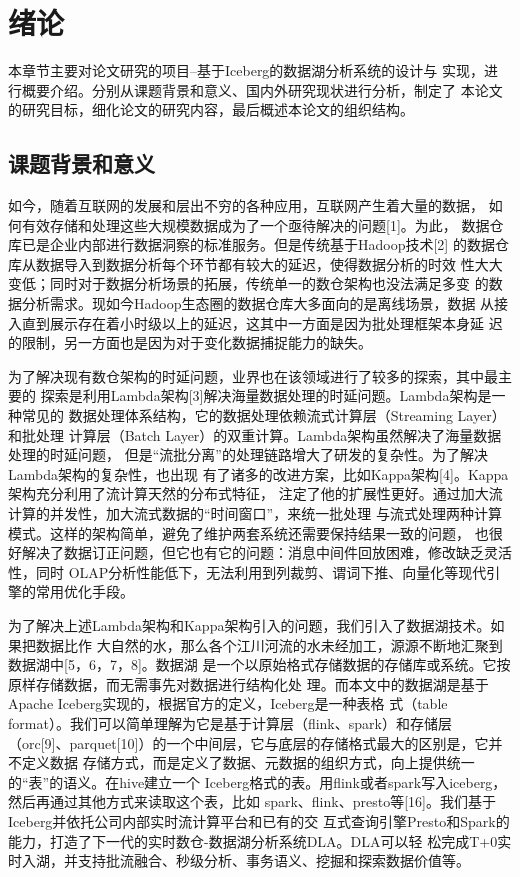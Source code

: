 
\chapter{绪论}

本章节主要对论文研究的项目--基于Iceberg的数据湖分析系统的设计与
实现，进行概要介绍。分别从课题背景和意义、国内外研究现状进行分析，制定了
本论文的研究目标，细化论文的研究内容，最后概述本论文的组织结构。

\section{课题背景和意义}

如今，随着互联网的发展和层出不穷的各种应用，互联网产生着大量的数据，
如何有效存储和处理这些大规模数据成为了一个亟待解决的问题[1]。为此，
数据仓库已是企业内部进行数据洞察的标准服务。但是传统基于Hadoop技术[2]
的数据仓库从数据导入到数据分析每个环节都有较大的延迟，使得数据分析的时效
性大大变低；同时对于数据分析场景的拓展，传统单一的数仓架构也没法满足多变
的数据分析需求。现如今Hadoop生态圈的数据仓库大多面向的是离线场景，数据
从接入直到展示存在着小时级以上的延迟，这其中一方面是因为批处理框架本身延
迟的限制，另一方面也是因为对于变化数据捕捉能力的缺失。

为了解决现有数仓架构的时延问题，业界也在该领域进行了较多的探索，其中最主要的
探索是利用Lambda架构[3]解决海量数据处理的时延问题。Lambda架构是一种常见的
数据处理体系结构，它的数据处理依赖流式计算层（Streaming Layer）和批处理
计算层（Batch Layer）的双重计算。Lambda架构虽然解决了海量数据处理的时延问题，
但是“流批分离”的处理链路增大了研发的复杂性。为了解决Lambda架构的复杂性，也出现
有了诸多的改进方案，比如Kappa架构[4]。Kappa架构充分利用了流计算天然的分布式特征，
注定了他的扩展性更好。通过加大流计算的并发性，加大流式数据的“时间窗口”，来统一批处理
与流式处理两种计算模式。这样的架构简单，避免了维护两套系统还需要保持结果一致的问题，
也很好解决了数据订正问题，但它也有它的问题：消息中间件回放困难，修改缺乏灵活性，同时
OLAP分析性能低下，无法利用到列裁剪、谓词下推、向量化等现代引擎的常用优化手段。

为了解决上述Lambda架构和Kappa架构引入的问题，我们引入了数据湖技术。如果把数据比作
大自然的水，那么各个江川河流的水未经加工，源源不断地汇聚到数据湖中[5，6，7，8]。数据湖
是一个以原始格式存储数据的存储库或系统。它按原样存储数据，而无需事先对数据进行结构化处
理。而本文中的数据湖是基于Apache Iceberg实现的，根据官方的定义，Iceberg是一种表格
式（table format）。我们可以简单理解为它是基于计算层（flink、spark）和存储层
（orc[9]、parquet[10]）的一个中间层，它与底层的存储格式最大的区别是，它并不定义数据
存储方式，而是定义了数据、元数据的组织方式，向上提供统一的“表”的语义。在hive建立一个
Iceberg格式的表。用flink或者spark写入iceberg，然后再通过其他方式来读取这个表，比如
spark、flink、presto等[16]。我们基于Iceberg并依托公司内部实时流计算平台和已有的交
互式查询引擎Presto和Spark的能力，打造了下一代的实时数仓-数据湖分析系统DLA。DLA可以轻
松完成T+0实时入湖，并支持批流融合、秒级分析、事务语义、挖掘和探索数据价值等。

